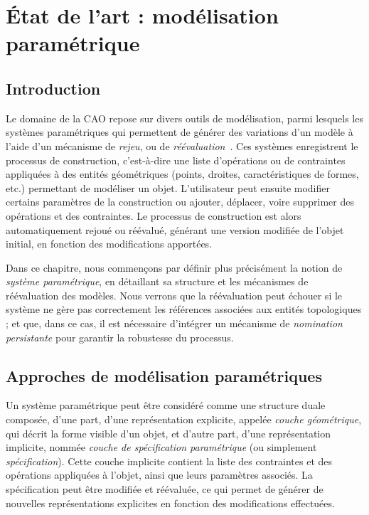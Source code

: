\chapter{État de l'art : modélisation paramétrique}
\label{cha:etat-art-modelisation-parametrique}



\section{Introduction}
\label{sec:etat-art-modelisation-parametrique-introduction}



Le domaine de la CAO repose sur divers outils de modélisation, parmi lesquels les systèmes paramétriques qui permettent de générer des variations d'un modèle à l'aide d'un mécanisme de \textit{rejeu}, ou de
\textit{réévaluation}~\cite{dassaultCATIA,dassaultSOLIDWORKS,autodeskAUTOCAD,autodeskREVIT,siemensNX}. %
Ces systèmes enregistrent le processus de construction, c'est-à-dire une liste d'opérations ou de contraintes appliquées à des entités géométriques (points, droites, caractéristiques de formes, etc.) permettant de modéliser un objet. L'utilisateur peut ensuite modifier certains paramètres de la construction ou ajouter, déplacer, voire supprimer des opérations et des contraintes. Le processus de construction est alors automatiquement rejoué ou réévalué, générant une version modifiée de l'objet initial, en fonction des modifications apportées.  %

Dans ce chapitre, nous commençons par définir plus précisément la notion de \textit{système paramétrique}, en détaillant sa structure et les mécanismes de réévaluation des modèles. Nous verrons que la réévaluation peut échouer si le système ne gère pas correctement les références associées aux entités topologiques ; et que, dans ce cas, il est nécessaire d'intégrer un mécanisme de \textit{nomination persistante} pour garantir la robustesse du processus.

\section{Approches de modélisation paramétriques}
\label{sec:etat-art-approches-modelisation-parametrique}

Un système paramétrique peut être considéré comme une structure duale composée, d'une part, d'une représentation explicite, appelée \emph{couche géométrique}, qui décrit la forme visible d'un objet, et d'autre part, d'une représentation implicite, nommée \emph{couche de spécification paramétrique} (ou simplement \emph{spécification}). Cette couche implicite contient la liste des contraintes et des opérations appliquées à l'objet, ainsi que leurs paramètres associés. La spécification peut être modifiée et réévaluée, ce qui permet de générer de nouvelles représentations explicites en fonction des modifications effectuées.

